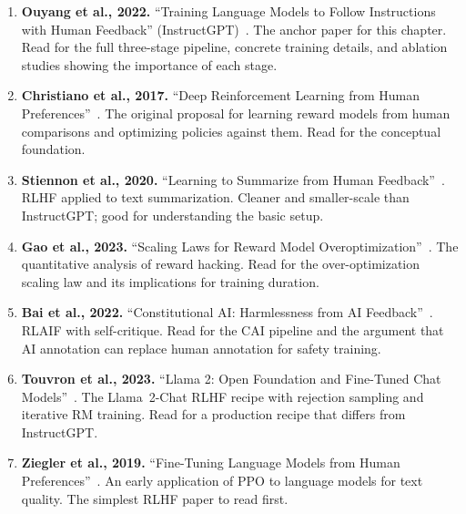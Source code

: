 \begin{enumerate}[nosep]
  \item \textbf{Ouyang et al., 2022.} ``Training Language Models to Follow Instructions with Human Feedback'' (InstructGPT)~\cite{ouyang2022instructgpt}. The anchor paper for this chapter. Read for the full three-stage pipeline, concrete training details, and ablation studies showing the importance of each stage.
  \item \textbf{Christiano et al., 2017.} ``Deep Reinforcement Learning from Human Preferences''~\cite{christiano2017deep}. The original proposal for learning reward models from human comparisons and optimizing policies against them. Read for the conceptual foundation.
  \item \textbf{Stiennon et al., 2020.} ``Learning to Summarize from Human Feedback''~\cite{stiennon2020summarize}. RLHF applied to text summarization. Cleaner and smaller-scale than InstructGPT; good for understanding the basic setup.
  \item \textbf{Gao et al., 2023.} ``Scaling Laws for Reward Model Overoptimization''~\cite{gao2023scaling}. The quantitative analysis of reward hacking. Read for the over-optimization scaling law and its implications for training duration.
  \item \textbf{Bai et al., 2022.} ``Constitutional AI: Harmlessness from AI Feedback''~\cite{bai2022constitutional}. RLAIF with self-critique. Read for the CAI pipeline and the argument that AI annotation can replace human annotation for safety training.
  \item \textbf{Touvron et al., 2023.} ``Llama 2: Open Foundation and Fine-Tuned Chat Models''~\cite{touvron2023llama2}. The Llama~2-Chat RLHF recipe with rejection sampling and iterative RM training. Read for a production recipe that differs from InstructGPT.
  \item \textbf{Ziegler et al., 2019.} ``Fine-Tuning Language Models from Human Preferences''~\cite{ziegler2019finetuning}. An early application of PPO to language models for text quality. The simplest RLHF paper to read first.
\end{enumerate}

\flushbottom
